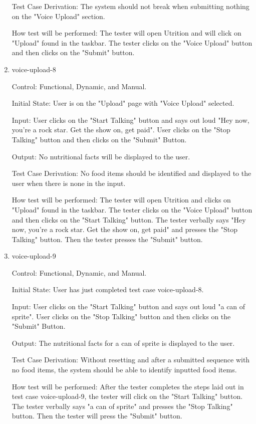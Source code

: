 \documentclass[12pt, titlepage]{article}
\begin{document}
\begin{enumerate}
	Test Case Derivation: The system should not break when submitting nothing on the "Voice Upload" section.
	
	How test will be performed: The tester will open Utrition and will click on "Upload" found in the taskbar. The tester clicks on the "Voice Upload" button and then clicks on the "Submit" button.
	
	\item{voice-upload-8\\}
	
	Control: Functional, Dynamic, and Manual.
	
	Initial State: User is on the "Upload" page with "Voice Upload" selected.
	
	Input: User clicks on the "Start Talking" button and says out loud "Hey now, you're a rock star. Get the show on, get paid". User clicks on the "Stop Talking" button and then clicks on the "Submit" Button.
	
	Output: No nutritional facts will be displayed to the user.
	
	Test Case Derivation: No food items should be identified and displayed to the user when there is none in the input.
	
	How test will be performed: The tester will open Utrition and clicks on "Upload" found in the taskbar. The tester clicks on the "Voice Upload" button and then clicks on the "Start Talking" button. The tester verbally says "Hey now, you're a rock star. Get the show on, get paid" and presses the "Stop Talking" button. Then the tester presses the "Submit" button.
	
	\item{voice-upload-9\\}
	
	Control: Functional, Dynamic, and Manual.
	
	Initial State: User has just completed test case voice-upload-8.
	
	Input: User clicks on the "Start Talking" button and says out loud "a can of sprite". User clicks on the "Stop Talking" button and then clicks on the "Submit" Button.
	
	Output: The nutritional facts for a can of sprite is displayed to the user.
	
	Test Case Derivation: Without resetting and after a submitted sequence with no food items, the system should be able to identify inputted food items.
	
	How test will be performed: After the tester completes the steps laid out in test case voice-upload-9, the tester will click on the "Start Talking" button. The tester verbally says "a can of sprite" and presses the "Stop Talking" button. Then the tester will press the "Submit" button.
	

\end{enumerate}
\end{document}
